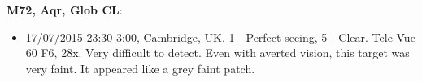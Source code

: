 {\bf M72, Aqr, Glob CL}:
\begin{itemize}
\item 17/07/2015 23:30-3:00, Cambridge, UK. 1 - Perfect seeing, 5 - Clear. Tele Vue 60 F6, 28x. Very difficult to detect. Even with averted vision, this target was very faint. It appeared like a grey faint patch.
\end{itemize}
